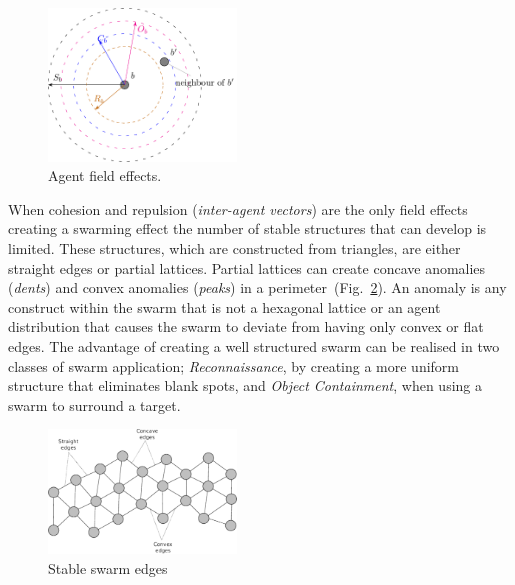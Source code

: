 \documentclass[preprint,12pt]{elsarticle}
\begin{document}
\begin{figure}
\begin{center}
\includegraphics[width=5cm]{figures/stableswarm}
\end{center}
\caption{Agent field effects.\label{methods:FieldEffects}}
\end{figure}

When cohesion and repulsion (\textit{inter-agent vectors}) are the only field effects creating a swarming effect the number of stable structures that can develop is limited. These structures, which are constructed from triangles, are either straight edges or partial lattices. Partial lattices can create concave anomalies (\textit{dents}) and convex anomalies (\textit{peaks}) in a perimeter~(Fig.~\ref{concave:SwarmStableShape1}). An anomaly is any construct within the swarm that is not a hexagonal lattice or an agent distribution that causes the swarm to deviate from having only convex or flat edges. The advantage of creating a well structured swarm can be realised in two classes of swarm application; \textit{Reconnaissance}, by creating a more uniform structure that eliminates blank spots, and \textit{Object Containment}, when using a swarm to surround a target.  

\begin{figure}
\begin{center}
\includegraphics[width=5cm]{figures/SwarmStableShape1}
\end{center}
\caption{Stable swarm edges\label{concave:SwarmStableShape1}}
\end{figure}
\end{document}
